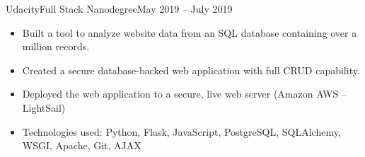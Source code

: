 \begin{cvsubsection}{Udacity}{Full Stack Nanodegree}{May 2019 -- July 2019}
	\begin{itemize}
		\item Built a tool to analyze website data from an SQL database containing over a million records.
		\item Created a secure database-backed web application with full CRUD capability.
		\item Deployed the web application to a secure, live web server (Amazon AWS – LightSail)
		\item Technologies used: Python, Flask, JavaScript, PostgreSQL, SQLAlchemy, WSGI, Apache, Git, AJAX
	\end{itemize}
\end{cvsubsection}